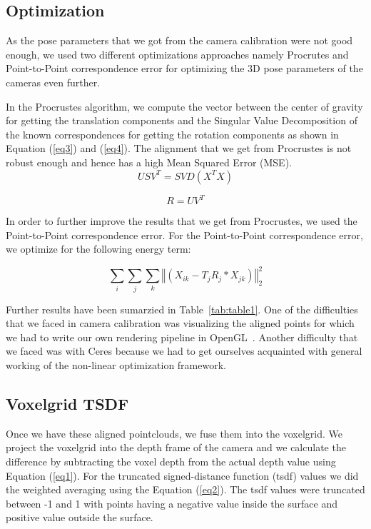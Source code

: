 \documentclass[10pt,twocolumn,letterpaper]{article}
\begin{document}
\subsection{Optimization}
As the pose parameters that we got from the camera calibration were not good enough, we used two different optimizations approaches namely Procrutes and Point-to-Point correspondence error for optimizing the 3D pose parameters of the cameras even further.
 
In the Procrustes algorithm, we compute the vector between the center of gravity for getting the translation components and the Singular Value Decomposition of the known correspondences for getting the rotation components as shown in Equation (\ref{eq3}) and (\ref{eq4}). The alignment that we get from Procrustes is not robust enough and hence has a high Mean Squared Error (MSE).\\

\begin{equation}\label{eq3}
USV^T=SVD(X^TX)
\end{equation}

\begin{equation}\label{eq4}
R=UV^T
\end{equation}

In order to further improve the results that we get from Procrustes, we used the Point-to-Point correspondence error. For the Point-to-Point correspondence error, we optimize for the following energy term:

\begin{equation}\label{eq5}
\sum_{i}\sum_{j}\sum_{k} \left\Vert\left(X_{ik} - T_jR_j*X_{jk}\right)\right\Vert_2^2
\end{equation}

Further results have been sumarzied in Table~\ref{tab:table1}. One of the difficulties that we faced in camera calibration was visualizing the aligned points for which we had to write our own rendering pipeline in OpenGL~\cite{Authors3}. Another difficulty that we faced was with Ceres because we had to get ourselves acquainted with general working of the non-linear optimization framework. 
\subsection{Voxelgrid TSDF}
Once we have these aligned pointclouds, we fuse them into the voxelgrid. We project the voxelgrid into the depth frame of the camera and we calculate the difference by subtracting the voxel depth from the actual depth value using Equation (\ref{eq1}). For the truncated signed-distance function (tsdf) values we did the weighted averaging using the Equation (\ref{eq2}). The tsdf values were truncated between -1 and 1 with points having a negative value inside the surface and positive value outside the surface.
\end{document}

